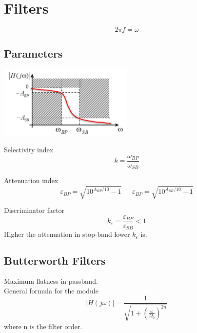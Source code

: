\chapter{Filters}

\begin{equation}
2\pi f=\omega
\end{equation}

\section{Parameters}

\centering
\includegraphics[width=0.5\textwidth]{mask.png}\\
\raggedright

Selectivity index
\begin{equation}
k=\frac{\omega_{BP}}{\omega_{SB}}
\end{equation}

Attenuation index
\begin{equation}
\varepsilon_{BP}=\sqrt{10^{A_{BP}/10}-1} \ \ \ \ \ \ \ \varepsilon_{BP}=\sqrt{10^{A_{SB}/10}-1}
\end{equation}

Discriminator factor 
\begin{equation}
k_{\varepsilon}=\frac{\varepsilon_{BP}}{\varepsilon_{SB}}<1
\end{equation}
Higher the attenuation in stop-band lower $k_{\varepsilon}$ is.

\section{Butterworth Filters}
Maximum flatness in passband.\\

General formula for the module 
\begin{equation}
|H(j\omega)|=\frac{1}{\sqrt{1+(\frac{\omega}{\Omega_0})^{2n}}}
\end{equation}
where n is the filter order.\\

